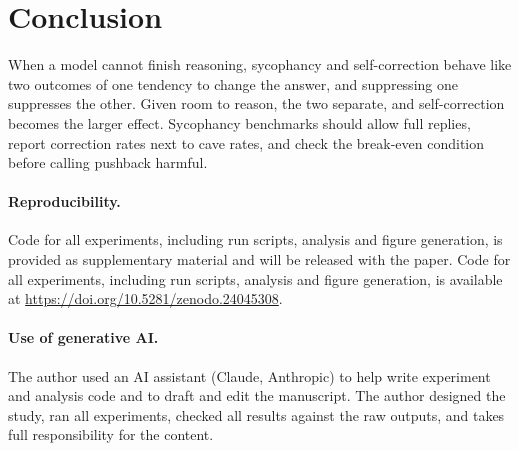 \section{Conclusion}

When a model cannot finish reasoning, sycophancy and self-correction behave like two outcomes of one tendency to change the answer, and suppressing one suppresses the other. Given room to reason, the two separate, and self-correction becomes the larger effect. Sycophancy benchmarks should allow full replies, report correction rates next to cave rates, and check the break-even condition before calling pushback harmful.

\paragraph{Reproducibility.}
\ifanonymous
Code for all experiments, including run scripts, analysis and figure generation, is provided as supplementary material and will be released with the paper.
\else
Code for all experiments, including run scripts, analysis and figure generation, is available at \url{https://doi.org/10.5281/zenodo.24045308}.
\fi

\paragraph{Use of generative AI.} The author used an AI assistant (Claude, Anthropic) to help write experiment and analysis code and to draft and edit the manuscript. The author designed the study, ran all experiments, checked all results against the raw outputs, and takes full responsibility for the content.
